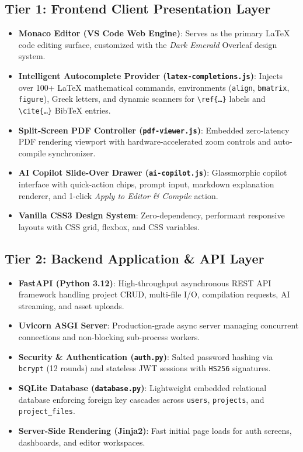 \documentclass[11pt,a4paper]{article}
\begin{document}
\subsection{Tier 1: Frontend Client Presentation Layer}
\begin{itemize}[leftmargin=1.5em]
    \item \textbf{Monaco Editor (VS Code Web Engine)}: Serves as the primary LaTeX code editing surface, customized with the \textit{Dark Emerald} Overleaf design system.
    \item \textbf{Intelligent Autocomplete Provider (\texttt{latex-completions.js})}: Injects over 100+ LaTeX mathematical commands, environments (\texttt{align}, \texttt{bmatrix}, \texttt{figure}), Greek letters, and dynamic scanners for \texttt{\textbackslash ref\{\dots\}} labels and \texttt{\textbackslash cite\{\dots\}} BibTeX entries.
    \item \textbf{Split-Screen PDF Controller (\texttt{pdf-viewer.js})}: Embedded zero-latency PDF rendering viewport with hardware-accelerated zoom controls and auto-compile synchronizer.
    \item \textbf{AI Copilot Slide-Over Drawer (\texttt{ai-copilot.js})}: Glassmorphic copilot interface with quick-action chips, prompt input, markdown explanation renderer, and 1-click \textit{Apply to Editor \& Compile} action.
    \item \textbf{Vanilla CSS3 Design System}: Zero-dependency, performant responsive layouts with CSS grid, flexbox, and CSS variables.
\end{itemize}

\subsection{Tier 2: Backend Application \& API Layer}
\begin{itemize}[leftmargin=1.5em]
    \item \textbf{FastAPI (Python 3.12)}: High-throughput asynchronous REST API framework handling project CRUD, multi-file I/O, compilation requests, AI streaming, and asset uploads.
    \item \textbf{Uvicorn ASGI Server}: Production-grade async server managing concurrent connections and non-blocking sub-process workers.
    \item \textbf{Security \& Authentication (\texttt{auth.py})}: Salted password hashing via \texttt{bcrypt} (12 rounds) and stateless JWT sessions with \texttt{HS256} signatures.
    \item \textbf{SQLite Database (\texttt{database.py})}: Lightweight embedded relational database enforcing foreign key cascades across \texttt{users}, \texttt{projects}, and \texttt{project\_files}.
    \item \textbf{Server-Side Rendering (Jinja2)}: Fast initial page loads for auth screens, dashboards, and editor workspaces.
\end{itemize}
\end{document}
